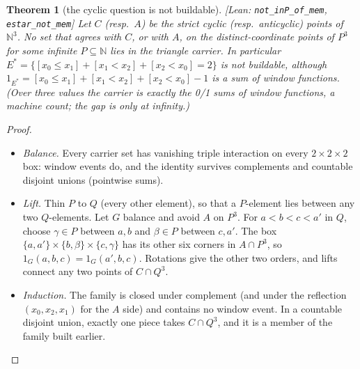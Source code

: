 \documentclass[11pt]{article}
\theoremstyle{plain}
\newtheorem{theorem}{Theorem}[section]
\theoremstyle{definition}
\newcommand{\bbN}{\mathbb{N}}
\newcommand{\st}[1]{\textsf{\small[#1]}}
\begin{document}
\begin{theorem}[the cyclic question is not buildable]\label{thm:estar}\st{Lean:
\texttt{not\_inP\_of\_mem}, \texttt{estar\_not\_mem}}
Let $C$ (resp.\ $A$) be the strict cyclic (resp.\ anticyclic) points of $\bbN^3$.
No set that agrees with $C$, or with $A$, on the distinct-coordinate points of
$P^3$ for some infinite $P\subseteq\bbN$ lies in the triangle carrier. In
particular $E^*=\{[x_0\le x_1]+[x_1<x_2]+[x_2<x_0]=2\}$ is not buildable,
although $1_{E^*}=[x_0\le x_1]+[x_1<x_2]+[x_2<x_0]-1$ is a sum of window
functions. (Over three values the carrier is exactly the 0/1 sums of window
functions, a machine count; the gap is only at infinity.)
\end{theorem}
\begin{proof}
\begin{itemize}[nosep]
  \item \emph{Balance.} Every carrier set has vanishing triple interaction on
    every $2\times2\times2$ box: window events do, and the identity survives
    complements and countable disjoint unions (pointwise sums).
  \item \emph{Lift.} Thin $P$ to $Q$ (every other element), so that a
    $P$-element lies between any two $Q$-elements. Let $G$ balance and avoid
    $A$ on $P^3$. For $a<b<c<a'$ in $Q$, choose $\gamma\in P$ between $a,b$ and
    $\beta\in P$ between $c,a'$. The box
    $\{a,a'\}\times\{b,\beta\}\times\{c,\gamma\}$ has its other six corners in
    $A\cap P^3$, so $1_G(a,b,c)=1_G(a',b,c)$. Rotations give the other two
    orders, and lifts connect any two points of $C\cap Q^3$.
  \item \emph{Induction.} The family is closed under complement (and under
    the reflection $(x_0,x_2,x_1)$ for the $A$ side) and contains no window
    event. In a countable disjoint union, exactly one piece takes
    $C\cap Q^3$, and it is a member of the family built earlier.\qedhere
\end{itemize}
\end{proof}
\end{document}

